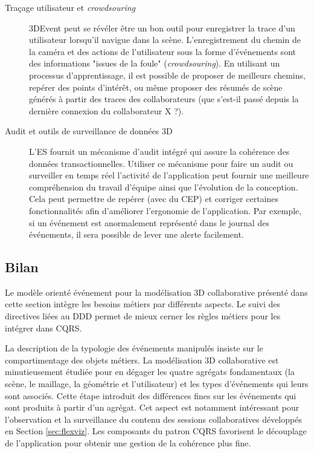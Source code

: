 \begin{description}
	\item[Traçage utilisateur et \textit{crowdsouring}] 3DEvent peut se révéler être 
	un bon outil pour enregistrer la trace d'un utilisateur lorsqu'il navigue dans la 
	scène. L'enregistrement du chemin de la caméra et des actions de l'utilisateur 
	sous la forme d'événements sont des informations 
	"issues de la foule" (\textit{crowdsouring}). En utilisant un processus 
	d'apprentissage, il est possible de proposer de meilleurs chemins, repérer des 
	points d'intérêt, ou même proposer des résumés de scène générés à partir des 
	traces des collaborateurs (que s'est-il passé depuis la dernière connexion du 
	collaborateur X ?).
	\item[Audit et outils de surveillance de données 3D] L'\gls{ES} fournit un 
	mécanisme 
	d'audit intégré qui assure la cohérence des données transactionnelles. Utiliser 
	ce mécanisme pour faire un audit ou surveiller en temps réel l'activité de 
	l'application peut fournir une meilleure compréhension du travail d'équipe ainsi 
	que l'évolution de la conception. Cela peut permettre de repérer (avec du 
	\gls{CEP}) et corriger certaines fonctionnalités afin d'améliorer l'ergonomie de 
	l'application. Par exemple, si un événement est anormalement représenté dans 
	le journal des événements, il sera possible de lever une alerte facilement.
\end{description}
\subsection{Bilan}

Le modèle orienté événement pour la modélisation 3D collaborative présenté dans 
cette section intègre les besoins métiers par différents aspects. Le suivi des 
directives liées au \gls{DDD} permet de mieux cerner les règles 
métiers pour les intégrer dans \gls{CQRS}. 

La description de la typologie des 
événements manipulés insiste sur le compartimentage des objets métiers. La 
modélisation 3D collaborative est minutieusement étudiée pour en dégager les quatre 
agrégats fondamentaux (la scène, le maillage, la géométrie et l'utilisateur) et les 
types d'événements qui leurs sont associés. Cette étape introduit des différences 
fines sur les événements qui sont produits à partir d'un agrégat. 
Cet aspect est notamment intéressant pour l'observation et la surveillance du 
contenu des sessions collaboratives développés en Section 
\ref{sec:flexviz}. 
Les composants du patron \gls{CQRS} favorisent le découplage de l'application 
pour obtenir une gestion de la cohérence plus fine. 

